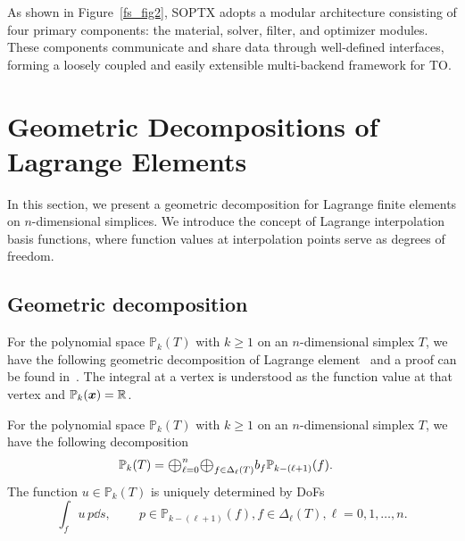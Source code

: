 \documentclass[mathpazo]{cicp}
\newcommand{\Oplus}{\ensuremath{\vcenter{\hbox{\scalebox{1.5}{$\oplus$}}}}}
\begin{document}
As shown in Figure~\ref{fs_fig2}, SOPTX adopts a modular architecture consisting of four primary components: the material, solver, filter, and optimizer modules. These components communicate and share data through well-defined interfaces, forming a loosely coupled and easily extensible multi-backend framework for TO.




\section{Geometric Decompositions of Lagrange Elements}\label{sec:lagrange}
In this section, we present a geometric decomposition for Lagrange finite elements on $n$-dimensional simplices. We introduce the concept of Lagrange interpolation basis functions, where function values at interpolation points serve as degrees of freedom. 

\subsection{Geometric decomposition}
For the polynomial space $\mathbb P_k(T)$ with $k\geq 1$ on an $n$-dimensional simplex $T$, we have the following geometric decomposition of Lagrange element~\cite[(2.6)]{ArnoldFalkWinther2009} and a proof can be found in~\cite{Chen;Huang:2021Geometric}. The integral at a vertex is understood as the function value at that vertex and $\mathbb P_k({\boldsymbol x}) = \mathbb R$.

\begin{theorem}\label{thm:Lagrangedec}
For the polynomial space $\mathbb P_k(T)$ with $k\geq 1$ on an $n$-dimensional simplex $T$, we have the following decomposition %
\begin{align}
\label{eq:Prdec}
\mathbb P_k(T) &= \Oplus_{\ell = 0}^n\Oplus_{f\in \Delta_{\ell}(T)} b_f\mathbb P_{k - (\ell +1)} (f).
\end{align}
The function $u\in \mathbb P_k(T)$ is uniquely determined by DoFs
\begin{equation}\label{eq:dofPr}
\int_f u \, p \dd s, \quad \quad~p\in \mathbb P_{k - (\ell +1)} (f), f\in \Delta_{\ell}(T), \ell = 0,1,\ldots, n.
\end{equation}
\end{theorem}

\end{document}
